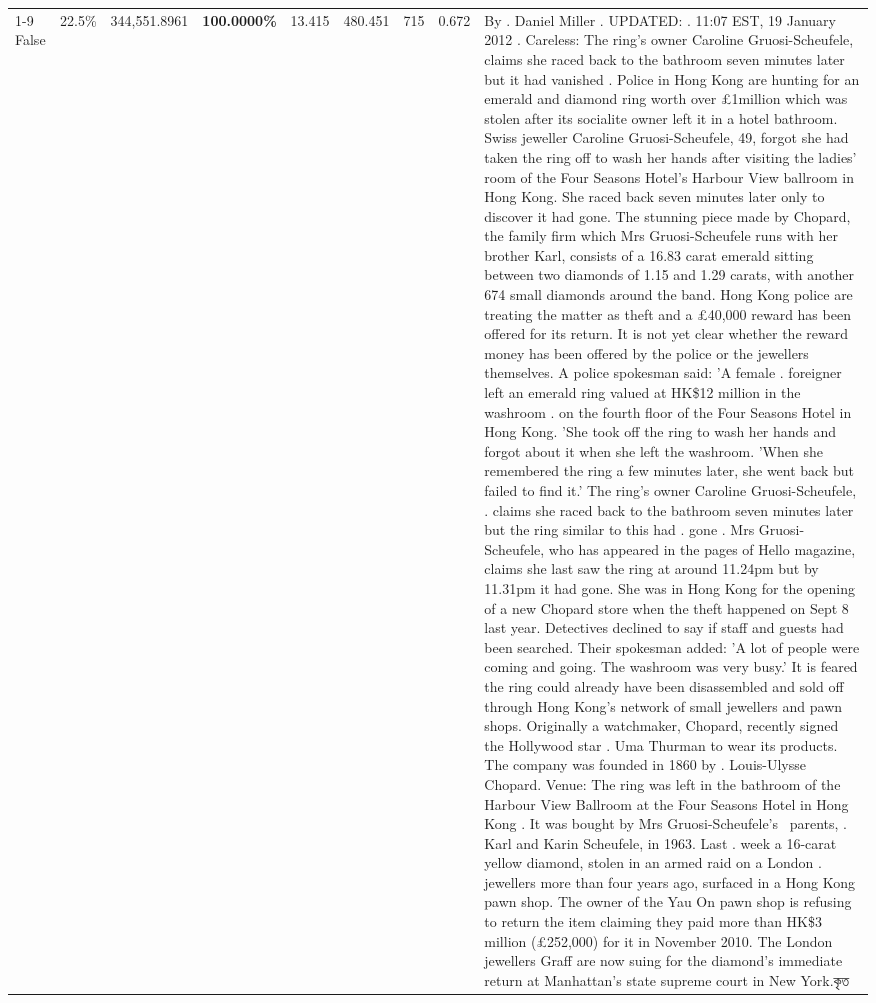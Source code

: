 \begin{table}[H]
\begin{tabular}{lllrlllll}
\cline{1-9}
False & 22.5\% & 344,551.8961 & \bfseries \color{red} 100.0000\% & 13.415 & 480.451 & 715 & 0.672 & By . Daniel Miller . UPDATED: . 11:07 EST, 19 January 2012 . Careless: The ring's owner Caroline Gruosi-Scheufele, claims she raced back to the bathroom seven minutes later but it had vanished . Police in Hong Kong are hunting for an emerald and diamond ring worth over £1million which was stolen after its socialite owner left it in a hotel bathroom. Swiss jeweller Caroline Gruosi-Scheufele, 49, forgot she had taken the ring off to wash her hands after visiting the ladies' room of the Four Seasons Hotel's Harbour View ballroom in Hong Kong. She raced back seven minutes later only to discover it had gone. The stunning piece made by Chopard, the family firm which Mrs Gruosi-Scheufele runs with her brother Karl, consists of a 16.83 carat emerald sitting between two diamonds of 1.15 and 1.29 carats, with another 674 small diamonds around the band. Hong Kong police are treating the matter as theft and a £40,000 reward has been offered for its return. It is not yet clear whether the reward money has been offered by the police or the jewellers themselves. A police spokesman said: 'A female . foreigner left an emerald ring valued at HK\$12 million in the washroom . on the fourth floor of the Four Seasons Hotel in Hong Kong. 'She took off the ring to wash her hands and forgot about it when she left the washroom. 'When she remembered the ring a few minutes later, she went back but failed to find it.' The ring's owner Caroline Gruosi-Scheufele, . claims she raced back to the bathroom seven minutes later but the ring similar to this had . gone . Mrs Gruosi-Scheufele, who has appeared in the pages of Hello magazine, claims she last saw the ring at around 11.24pm but by 11.31pm it had gone. She was in Hong Kong for the opening of a new Chopard store when the theft happened on Sept 8 last year. Detectives declined to say if staff and guests had been searched. Their spokesman added: 'A lot of people were coming and going. The washroom was very busy.' It is feared the ring could already have been disassembled and sold off through Hong Kong's network of small jewellers and pawn shops. Originally a watchmaker, Chopard, recently signed the Hollywood star . Uma Thurman to wear its products. The company was founded in 1860 by . Louis-Ulysse Chopard. Venue: The ring was left in the bathroom of the Harbour View Ballroom at the Four Seasons Hotel in Hong Kong . It was bought by Mrs Gruosi-Scheufele's  parents, . Karl and Karin Scheufele, in 1963. Last . week a 16-carat yellow diamond, stolen in an armed raid on a London . jewellers more than four years ago, surfaced in a Hong Kong pawn shop. The owner of the Yau On pawn shop is refusing to return the item claiming they paid more than HK\$3 million (£252,000) for it in November 2010. The London jewellers Graff are now suing for the diamond’s immediate return at Manhattan’s state supreme court in New York.কৃত \\

\end{tabular}
\end{table}
